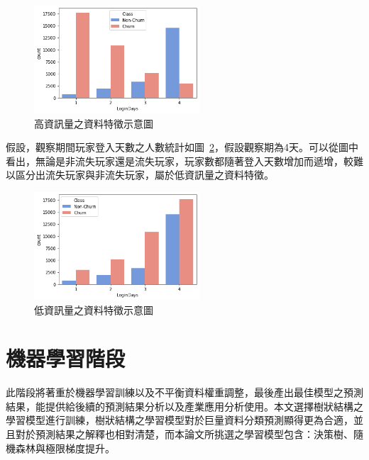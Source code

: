 \begin{figure}[!htb]
  \begin{center}
    \includegraphics[width=0.55\textwidth]{figures/Image_ValuableFeatures.png}
    \caption[高資訊量之資料特徵示意圖]{高資訊量之資料特徵示意圖}
    \label{fig:Image_ValuableFeatures}
  \end{center}
\end{figure}

假設，觀察期間玩家登入天數之人數統計如圖~\ref{fig:Image_WorthlessFeatures}，假設觀察期為4天。可以從圖中看出，無論是非流失玩家還是流失玩家，玩家數都隨著登入天數增加而遞增，較難以區分出流失玩家與非流失玩家，屬於低資訊量之資料特徵。

\begin{figure}[!htb]
  \begin{center}
    \includegraphics[width=0.55\textwidth]{figures/Image_WorthlessFeatures.png}
    \caption[低資訊量之資料特徵示意圖]{低資訊量之資料特徵示意圖}
    \label{fig:Image_WorthlessFeatures}
  \end{center}
\end{figure}
\newpage

\section{機器學習階段}
\label{sec:MachineLearning}

此階段將著重於機器學習訓練以及不平衡資料權重調整，最後產出最佳模型之預測結果，能提供給後續的預測結果分析以及產業應用分析使用。本文選擇樹狀結構之學習模型進行訓練，樹狀結構之學習模型對於巨量資料分類預測顯得更為合適，並且對於預測結果之解釋也相對清楚，而本論文所挑選之學習模型包含：決策樹、隨機森林與極限梯度提升。

